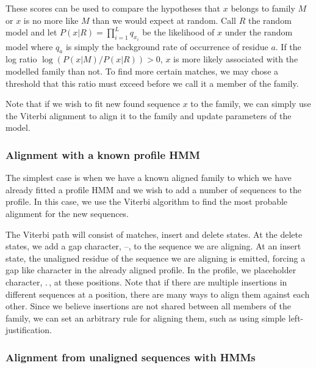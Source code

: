 \documentclass[11pt]{article}
\begin{document}
These  scores can be used to compare the hypotheses that $x$ belongs to family $M$ or $x$ is no more like $M$ than we would expect at random.  Call $R$ the random model and let  $P(x|R) = \prod_{i = 1}^L q_{x_i}$ be the likelihood of $x$ under the random model where $q_a$ is simply the background rate of occurrence of residue $a$.  If the log ratio $\log (P(x|M)/P(x|R)) > 0$, $x$ is more likely associated with the modelled family than not.  To find more certain matches, we may chose a threshold that this ratio must exceed before we call it a member of the family.



Note that if we wish to fit new found sequence $x$ to the family, we can simply use the Viterbi alignment to align it to the family and update parameters of the model. 

\subsubsection{Alignment with a known profile HMM}

The simplest case is when we have a known aligned family to which we have already fitted a profile HMM and we wish to add a number of sequences to the profile.  In this case, we use the Viterbi algorithm to find the most probable alignment for the new sequences.  

The Viterbi path will consist of matches, insert and delete states.   At the delete states, we add a gap character, --, to the sequence we are aligning.  At an insert state, the unaligned residue of the sequence we are aligning is emitted, forcing a gap like character in the already aligned profile.  In the profile, we placeholder character, .\,, at these positions.   Note that if there are multiple insertions in different sequences at a position, there are many ways to align them against each other.   Since we believe insertions are not shared between all members of the family, we can set an arbitrary rule for aligning them, such as using simple left-justification. 

\subsubsection{Alignment from unaligned sequences with HMMs}
\end{document}
